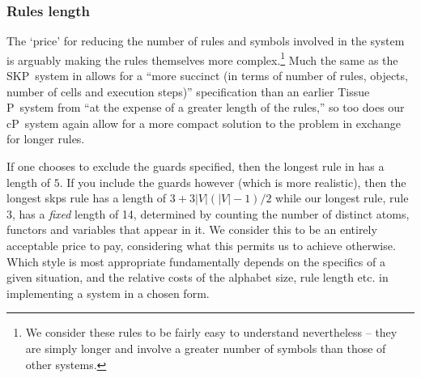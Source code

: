 \subsubsection{Rules length}
The `price' for reducing the number of rules and symbols involved in the system is arguably making the rules themselves more complex.\footnote{We consider these rules to be fairly easy to understand nevertheless -- they are simply longer and involve a greater number of symbols than those of other systems.}  Much the same as the SKP~system in \cite{Gheorghe2013} allows for a \enquote{more succinct (in terms of number of rules, objects, number of cells and execution steps)} specification than an earlier Tissue P~system from \cite{Diaz-Pernil2008} ``at the expense of a greater length of the rules,'' so too does our cP~system again allow for a more compact solution to the problem in exchange for longer rules.

If one chooses to exclude the guards specified, then the longest rule in \cite{Gheorghe2013} has a length of \(5\).  If you include the guards however (which is more realistic), then the longest \gls{skps} rule has a length of \(3 + 3|V|(|V| - 1)/2\) while our longest rule, rule 3, has a \emph{fixed} length of 14, determined by counting the number of distinct atoms, functors and variables that appear in it.  We consider this to be an entirely acceptable price to pay, considering what this permits us to achieve otherwise.  Which style is most appropriate fundamentally depends on the specifics of a given situation, and the relative costs of the alphabet size, rule length etc. in implementing a system in a chosen form.